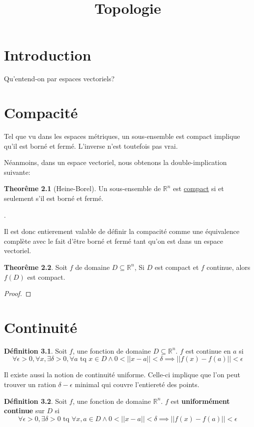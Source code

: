 \documentclass[12pt]{book}
\title{Topologie}
\let\Bbb\mathbb
\theoremstyle{definition}
\newtheorem{definition}{Définition}[section]
\newtheorem{theorem}{Theorême}[section]
\begin{document}
\chapter{Introduction}
Qu'entend-on par espaces vectoriels?

\chapter{Compacité}
Tel que vu dans les espaces métriques, un sous-ensemble est compact implique qu'il est borné et fermé.
L'inverse n'est toutefois pas vrai.

Néanmoins, dans un espace vectoriel, nous obtenons la double-implication suivante:
\begin{theorem}[Heine-Borel]
    \label{thm:heine_borel} Un sous-ensemble de $\Bbb R^n$ est \hyperref[def:compacite]{compact} si et seulement s'il est 
    borné et fermé.
\end{theorem}.

Il est donc entierement valable de définir la compacité comme une équivalence complète avec le fait d'être borné et fermé tant 
qu'on est dans un espace vectoriel.

\begin{theorem}
    \label{thm:compact_implique_compact}
    Soit $f$ de domaine $D \subseteq \Bbb R^n$, Si $D$ est compact et $f$ continue, alors $f(D)$ est compact.
\end{theorem}

\begin{proof}
\end{proof}

\chapter{Continuité}
\begin{definition}
    \label{def:continuite}
    Soit $f$, une fonction de domaine $D \subseteq \Bbb R^n$. $f$ est continue en $a$ si 
    $$\forall \epsilon > 0, \forall x, \exists \delta > 0, \forall a \text{ tq } x \in D \land 0 < ||x - a|| < \delta \implies || f(x) - f(a) || < \epsilon$$
\end{definition}

Il existe aussi la notion de continuité uniforme. Celle-ci implique que l'on peut trouver un ration $\delta-\epsilon$ minimal qui couvre
l'entiereté des points.
\begin{definition}
    \label{def:continuite_uniforme}
    Soit $f$, une fonction de domaine $\Bbb R^n$. $f$ est \textbf{uniformément continue} sur $D$ si 
    $$\forall \epsilon > 0, \exists \delta > 0 \text{ tq } \forall x, a \in D \land 0 < ||x - a|| < \delta \implies || f(x) - f(a) || < \epsilon$$
\end{definition}
\end{document}
